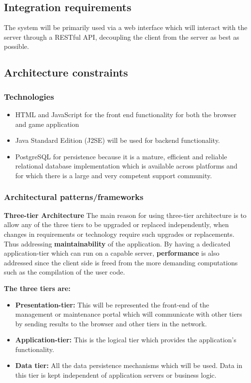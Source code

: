 \documentclass[english]{article}
\begin{document}
			
		\subsection{Integration requirements}
			\par The system will be primarily used via a web interface which will interact with the server through a RESTful API, decoupling the client from the server as best as possible.
			
		\setcounter{secnumdepth}{5}
		\subsection{Architecture constraints}
			\subsubsection{Technologies}
			\begin{itemize}
		  \item HTML and JavaScript for the front end functionality for both the browser and game application
		  \item Java Standard Edition (J2SE) will be used for backend functionality.
		  \item PostgreSQL for persistence because it is a mature, efficient and reliable relational database
          implementation which is available across platforms and for which there is a large and very competent
         support community.
       \end{itemize}
		\subsubsection{Architectural patterns/frameworks} %
		\textbf{Three-tier Architecture} %
		The main reason for using three-tier architecture is to allow any of the three tiers to be upgraded or replaced independently, when changes in requirements or technology require such upgrades or replacements. Thus addressing \textbf{maintainability} of the application. By having a dedicated application-tier which can run on a capable server, \textbf{performance} is also addressed since the client side is freed from the more demanding computations such as the compilation of the user code.
		
		\vspace{0.5cm}		
		
		\textbf{The three tiers are:}
			\begin{itemize}
			\item \textbf{Presentation-tier:} This will be represented the front-end of the management or maintenance portal which will communicate with other tiers by sending results to the browser and other tiers in the network.
			\item \textbf{Application-tier:} This is the logical tier which provides the application's functionality.	
			\item \textbf{Data tier:} All the data persistence mechanisms which will be used. Data in this tier is kept independent of application servers or business logic. 	
			\end{itemize}	
			
\end{document}
